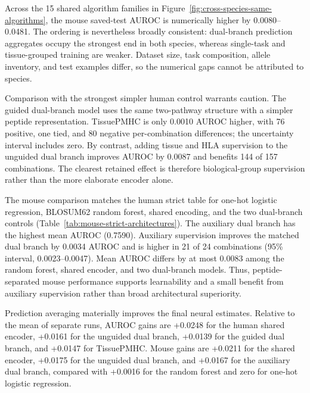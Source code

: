 
Across the 15 shared algorithm families in Figure~\ref{fig:cross-species-same-algorithms}, the mouse saved-test AUROC is numerically higher by 0.0080--0.0481. The ordering is nevertheless broadly consistent: dual-branch prediction aggregates occupy the strongest end in both species, whereas single-task and tissue-grouped training are weaker. Dataset size, task composition, allele inventory, and test examples differ, so the numerical gaps cannot be attributed to species.

Comparison with the strongest simpler human control warrants caution. The guided dual-branch model uses the same two-pathway structure with a simpler peptide representation. TissuePMHC is only 0.0010 AUROC higher, with 76 positive, one tied, and 80 negative per-combination differences; the uncertainty interval includes zero. By contrast, adding tissue and HLA supervision to the unguided dual branch improves AUROC by 0.0087 and benefits 144 of 157 combinations. The clearest retained effect is therefore biological-group supervision rather than the more elaborate encoder alone.

The mouse comparison matches the human strict table for one-hot logistic regression, BLOSUM62 random forest, shared encoding, and the two dual-branch controls (Table~\ref{tab:mouse-strict-architectures}). The auxiliary dual branch has the highest mean AUROC (0.7590). Auxiliary supervision improves the matched dual branch by 0.0034 AUROC and is higher in 21 of 24 combinations (95\% interval, 0.0023--0.0047). Mean AUROC differs by at most 0.0083 among the random forest, shared encoder, and two dual-branch models. Thus, peptide-separated mouse performance supports learnability and a small benefit from auxiliary supervision rather than broad architectural superiority.

Prediction averaging materially improves the final neural estimates. Relative to the mean of separate runs, AUROC gains are +0.0248 for the human shared encoder, +0.0161 for the unguided dual branch, +0.0139 for the guided dual branch, and +0.0147 for TissuePMHC\@. Mouse gains are +0.0211 for the shared encoder, +0.0175 for the unguided dual branch, and +0.0167 for the auxiliary dual branch, compared with +0.0016 for the random forest and zero for one-hot logistic regression.
